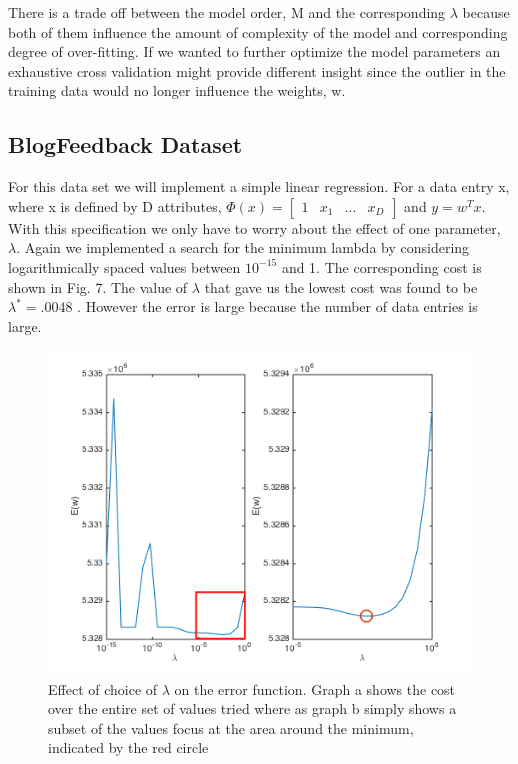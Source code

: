 \documentclass[10pt,twocolumn]{article}
\begin{document}
 There is a trade off between the model order, M and the corresponding $\lambda$ because both of them influence the amount of  complexity of the model and corresponding  degree of over-fitting.  If we wanted to further optimize the model parameters an exhaustive cross validation might provide different insight since the outlier in the training data would no longer influence the weights, w. 

\subsection*{ BlogFeedback Dataset}
For this data set we will implement a simple linear regression. For a data entry x, where x is defined by D attributes, $\Phi(x)= \begin{bmatrix} 1 &  x_1 & ... & x_D \end{bmatrix}$ and $y = w^T x$. With this specification we only have to worry about the effect of one parameter, $\lambda$. Again we implemented a search for the minimum lambda by considering logarithmically spaced values between $10^{-15}$ and 1. The corresponding cost is shown in Fig. 7. The value of $\lambda $ that gave us the lowest cost was found to be $\lambda ^* = .0048$ . However the error is large because the number of data entries is large.

\begin{figure}[H]
\center
\includegraphics[scale =.4]{3_3.png}
\caption{Effect of choice of $\lambda$ on the error function. Graph a shows the cost over the entire set of values tried where as graph b simply shows a subset of the values focus at the area around the minimum, indicated by the red circle}
\end{figure}
\end{document}
